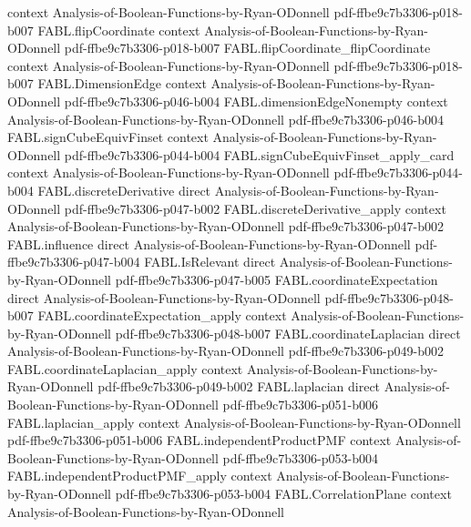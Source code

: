 \begin{theorem}
  {context}
  {Analysis-of-Boolean-Functions-by-Ryan-ODonnell}
  {pdf-ffbe9c7b3306-p018-b007}
\proofstep
  {FABL.flipCoordinate}
  {context}
  {Analysis-of-Boolean-Functions-by-Ryan-ODonnell}
  {pdf-ffbe9c7b3306-p018-b007}
\proofstep
  {FABL.flipCoordinate_flipCoordinate}
  {context}
  {Analysis-of-Boolean-Functions-by-Ryan-ODonnell}
  {pdf-ffbe9c7b3306-p018-b007}
\proofstep
  {FABL.DimensionEdge}
  {context}
  {Analysis-of-Boolean-Functions-by-Ryan-ODonnell}
  {pdf-ffbe9c7b3306-p046-b004}
\proofstep
  {FABL.dimensionEdgeNonempty}
  {context}
  {Analysis-of-Boolean-Functions-by-Ryan-ODonnell}
  {pdf-ffbe9c7b3306-p046-b004}
\proofstep
  {FABL.signCubeEquivFinset}
  {context}
  {Analysis-of-Boolean-Functions-by-Ryan-ODonnell}
  {pdf-ffbe9c7b3306-p044-b004}
\proofstep
  {FABL.signCubeEquivFinset_apply_card}
  {context}
  {Analysis-of-Boolean-Functions-by-Ryan-ODonnell}
  {pdf-ffbe9c7b3306-p044-b004}
\proofstep
  {FABL.discreteDerivative}
  {direct}
  {Analysis-of-Boolean-Functions-by-Ryan-ODonnell}
  {pdf-ffbe9c7b3306-p047-b002}
\proofstep
  {FABL.discreteDerivative_apply}
  {context}
  {Analysis-of-Boolean-Functions-by-Ryan-ODonnell}
  {pdf-ffbe9c7b3306-p047-b002}
\proofstep
  {FABL.influence}
  {direct}
  {Analysis-of-Boolean-Functions-by-Ryan-ODonnell}
  {pdf-ffbe9c7b3306-p047-b004}
\proofstep
  {FABL.IsRelevant}
  {direct}
  {Analysis-of-Boolean-Functions-by-Ryan-ODonnell}
  {pdf-ffbe9c7b3306-p047-b005}
\proofstep
  {FABL.coordinateExpectation}
  {direct}
  {Analysis-of-Boolean-Functions-by-Ryan-ODonnell}
  {pdf-ffbe9c7b3306-p048-b007}
\proofstep
  {FABL.coordinateExpectation_apply}
  {context}
  {Analysis-of-Boolean-Functions-by-Ryan-ODonnell}
  {pdf-ffbe9c7b3306-p048-b007}
\proofstep
  {FABL.coordinateLaplacian}
  {direct}
  {Analysis-of-Boolean-Functions-by-Ryan-ODonnell}
  {pdf-ffbe9c7b3306-p049-b002}
\proofstep
  {FABL.coordinateLaplacian_apply}
  {context}
  {Analysis-of-Boolean-Functions-by-Ryan-ODonnell}
  {pdf-ffbe9c7b3306-p049-b002}
\proofstep
  {FABL.laplacian}
  {direct}
  {Analysis-of-Boolean-Functions-by-Ryan-ODonnell}
  {pdf-ffbe9c7b3306-p051-b006}
\proofstep
  {FABL.laplacian_apply}
  {context}
  {Analysis-of-Boolean-Functions-by-Ryan-ODonnell}
  {pdf-ffbe9c7b3306-p051-b006}
\proofstep
  {FABL.independentProductPMF}
  {context}
  {Analysis-of-Boolean-Functions-by-Ryan-ODonnell}
  {pdf-ffbe9c7b3306-p053-b004}
\proofstep
  {FABL.independentProductPMF_apply}
  {context}
  {Analysis-of-Boolean-Functions-by-Ryan-ODonnell}
  {pdf-ffbe9c7b3306-p053-b004}
\proofstep
  {FABL.CorrelationPlane}
  {context}
  {Analysis-of-Boolean-Functions-by-Ryan-ODonnell}

\end{theorem}
